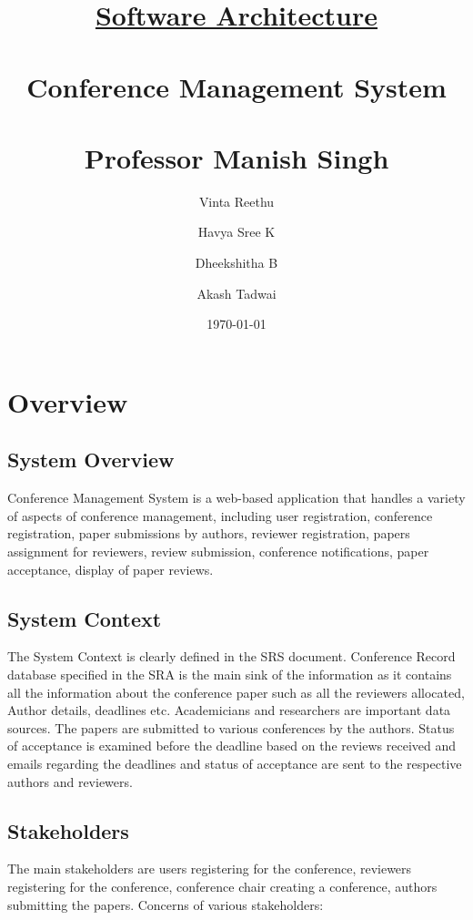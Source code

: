\documentclass[english,a4paper,12pt]{report}
\title{\textbf{\underline{\Huge{Software Architecture}}}\\~\\
\textbf{Conference Management System}\\~\\ 
Professor Manish Singh\\
}
\author{Vinta Reethu \and Havya Sree K \and Dheekshitha B \and Akash Tadwai }
\date{\today}
\begin{document}
\titleformat{\chapter}[display]   
{\normalfont\huge\bfseries}{\chaptertitlename\ \thechapter}{20pt}{\Huge}   
\titlespacing*{\chapter}{0pt}{-10pt}{40pt}
\maketitle

\newpage
\tableofcontents

\chapter{Overview}
\section{System Overview}
Conference Management System is a web-based application that handles a variety of aspects of conference management, including user registration, conference registration, paper submissions by authors, reviewer registration, papers assignment for reviewers, review submission, conference notifications, paper acceptance, display of paper reviews. 

\section{System Context}
The System Context is clearly defined in the SRS document. Conference Record database specified in the SRA is the main sink of the information as it contains all the information about the conference paper such as all the reviewers allocated, Author details, deadlines etc. Academicians and researchers are important data sources. The papers are submitted to various conferences by the authors. Status of acceptance is examined before the deadline based on the reviews received and emails regarding the deadlines and status of acceptance are sent to the respective authors and reviewers.


\section{Stakeholders}
The main stakeholders are users registering for the conference, reviewers registering for the conference, conference chair creating a conference, authors submitting the papers. Concerns of various stakeholders:
\end{document}

